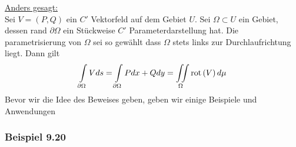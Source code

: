 \noindent\underline{Anders gesagt:}\\

\noindent Sei $V=\left( P,Q\right)$ ein $C'$ Vektorfeld auf dem Gebiet $U$. Sei $\Omega\subset U$ ein Gebiet, dessen rand $\partial\Omega$ ein Stückweise $C'$ Parameterdarstellung hat. Die parametrisierung von $\Omega$ sei so gewählt dass $\Omega$ stets links zur Durchlaufrichtung liegt. Dann gilt
\[\int\limits_{\partial \Omega } {Vds}  = \int\limits_{\partial \Omega } {Pdx + Qdy}  = \iint\limits_\Omega \operatorname{rot}\left( V \right)d\mu \]
Bevor wir die Idee des Beweises geben, geben wir einige Beispiele und Anwendungen

\subsubsection*{Beispiel 9.20}

